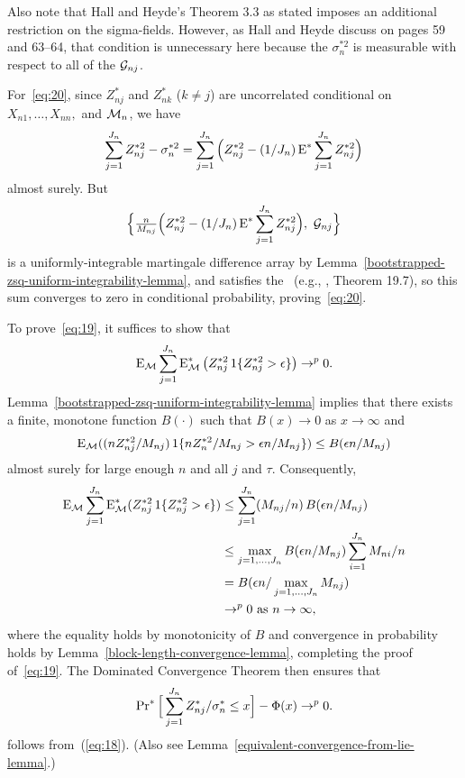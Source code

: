 \documentclass[11pt]{article}
\begin{document}
{{  Also note that Hall and Heyde's Theorem 3.3 as stated imposes an
  additional restriction on the sigma-fields. However, as Hall and
  Heyde discuss on pages 59 and 63--64, that condition is unnecessary
  here because the $\sigma_n^{*2}$ is measurable with respect to
  all of the $\mathcal{G}_{nj}$.} %

For~\eqref{eq:20}, since $Z_{nj}^*$ and $Z_{nk}^*$ ($k \neq j$) are uncorrelated
conditional on $X_{n1},\dots,X_{nn},$ and $\mathcal{M}_n$, we have
\begin{equation*}
  \sum_{j=1}^{J_n} Z_{nj}^{*2} - \sigma_n^{*2} =
  \sum_{j=1}^{J_n} \Big( Z_{nj}^{*2} - (1/J_n) \operatorname{E}^* \sum_{j=1}^{J_n} Z_{nj}^{*2} \Big)
\end{equation*}
almost surely. But
\begin{equation*}
   \Big\{\tfrac{n}{M_{nj}} \Big(Z_{nj}^{*2} - (1/J_n) \operatorname{E}^* \sum_{j=1}^{J_n} Z_{nj}^{*2}\Big),
   \ \mathcal{G}_{nj} \Big\}
\end{equation*}
is a uniformly-integrable martingale difference array
by Lemma~\ref{bootstrapped-zsq-uniform-integrability-lemma},
and satisfies the \lln\ (e.g., \citealp{Dav:94}, Theorem 19.7), so
this sum converges to zero in conditional probability, proving~\eqref{eq:20}.

To prove~\eqref{eq:19}, it suffices to show that
\begin{equation}\label{eq:21}
  \operatorname{E}_{\mathcal{M}} \sum_{j=1}^{J_n} \operatorname{E}_{\mathcal{M}}^{*}\big(Z_{nj}^{*2} \operatorname{1}\{Z_{nj}^{*2} > \epsilon\}\big) \to^p 0.
\end{equation}
Lemma~\ref{bootstrapped-zsq-uniform-integrability-lemma} implies that there exists a finite,
monotone function $B(\cdot)$ such that $B(x) \to 0$ as $x \to \infty$
and
\begin{equation*}
  \operatorname{E}_{\mathcal{M}}( (n Z_{nj}^{*2} / M_{nj}) \operatorname{1}\{n Z_n^{*2} / M_{nj} > \epsilon n / M_{nj}\}) \\
  \leq B(\epsilon n /M_{nj})
\end{equation*}
almost surely for large enough $n$ and all $j$ and $\tau$.  Consequently,
\begin{align*}
    \operatorname{E}_{\mathcal{M}} \sum_{j=1}^{J_n} \operatorname{E}_{\mathcal{M}}^{*}( Z_{nj}^{*2} \operatorname{1}\{Z_{nj}^{*2} > \epsilon\})
    & \leq \sum_{j=1}^{J_n} ( M_{nj} / n )\, B(\epsilon n /M_{nj}) \\
    & \leq \max_{j = 1,\dots,J_n} B(\epsilon n / M_{nj}) \sum_{i=1}^{J_n} M_{ni} / n \\
    & = B(\epsilon n / \max_{j = 1,\dots,J_n} M_{nj}) \\
    & \to^p 0 \text{\ as\ } n \to \infty,
\end{align*}
where the equality holds by monotonicity of $B$ and convergence in
probability holds by Lemma~\ref{block-length-convergence-lemma},
completing the proof of~\eqref{eq:19}.
The Dominated Convergence Theorem then ensures that
\begin{equation}\label{eq:22}
  \operatorname{Pr}^{*} \Big[\sum_{j=1}^{J_n}
  Z_{nj}^{*} / \sigma_n^* \leq x \Big] - \Phi(x) \to^p 0.
\end{equation}
follows from~(\ref{eq:18}). (Also see
Lemma~\ref{equivalent-convergence-from-lie-lemma}.)

}
\end{document}
